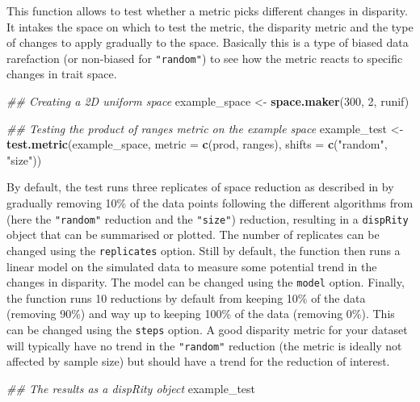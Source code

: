 \documentclass[
]{book}
\newenvironment{Shaded}{\begin{snugshade}}{\end{snugshade}}
\newcommand{\CommentTok}[1]{\textcolor[rgb]{0.56,0.35,0.01}{\textit{#1}}}
\newcommand{\DataTypeTok}[1]{\textcolor[rgb]{0.13,0.29,0.53}{#1}}
\newcommand{\DecValTok}[1]{\textcolor[rgb]{0.00,0.00,0.81}{#1}}
\newcommand{\KeywordTok}[1]{\textcolor[rgb]{0.13,0.29,0.53}{\textbf{#1}}}
\newcommand{\NormalTok}[1]{#1}
\newcommand{\StringTok}[1]{\textcolor[rgb]{0.31,0.60,0.02}{#1}}
\begin{document}
This function allows to test whether a metric picks different changes in disparity. It intakes the space on which to test the metric, the disparity metric and the type of changes to apply gradually to the space.
Basically this is a type of biased data rarefaction (or non-biased for \texttt{"random"}) to see how the metric reacts to specific changes in trait space.

\begin{Shaded}
\begin{Highlighting}[]
\CommentTok{\#\# Creating a 2D uniform space}
\NormalTok{example\_space \textless{}{-}}\StringTok{ }\KeywordTok{space.maker}\NormalTok{(}\DecValTok{300}\NormalTok{, }\DecValTok{2}\NormalTok{, runif)}

\CommentTok{\#\# Testing the product of ranges metric on the example space}
\NormalTok{example\_test \textless{}{-}}\StringTok{ }\KeywordTok{test.metric}\NormalTok{(example\_space, }\DataTypeTok{metric =} \KeywordTok{c}\NormalTok{(prod, ranges),}
                           \DataTypeTok{shifts =} \KeywordTok{c}\NormalTok{(}\StringTok{"random"}\NormalTok{, }\StringTok{"size"}\NormalTok{)) }
\end{Highlighting}
\end{Shaded}

By default, the test runs three replicates of space reduction as described in \citet{moms} by gradually removing 10\% of the data points following the different algorithms from \citet{moms} (here the \texttt{"random"} reduction and the \texttt{"size"}) reduction, resulting in a \texttt{dispRity} object that can be summarised or plotted.
The number of replicates can be changed using the \texttt{replicates} option.
Still by default, the function then runs a linear model on the simulated data to measure some potential trend in the changes in disparity.
The model can be changed using the \texttt{model} option.
Finally, the function runs 10 reductions by default from keeping 10\% of the data (removing 90\%) and way up to keeping 100\% of the data (removing 0\%).
This can be changed using the \texttt{steps} option.
A good disparity metric for your dataset will typically have no trend in the \texttt{"random"} reduction (the metric is ideally not affected by sample size) but should have a trend for the reduction of interest.

\begin{Shaded}
\begin{Highlighting}[]
\CommentTok{\#\# The results as a dispRity object}
\NormalTok{example\_test}
\end{Highlighting}
\end{Shaded}
\end{document}
